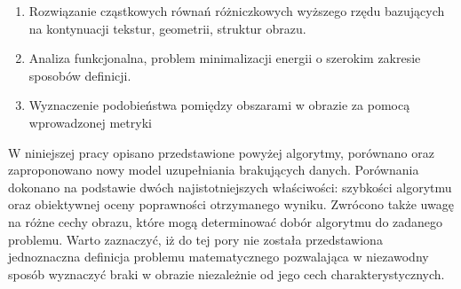 \documentclass[12pt, twoside, openany]{report}
\theoremstyle{definition}
\begin{document}
\begin{enumerate}
\item
Rozwiązanie cząstkowych równań różniczkowych wyższego rzędu bazujących na kontynuacji tekstur, geometrii, struktur obrazu.
\item
Analiza funkcjonalna, problem minimalizacji energii o szerokim zakresie sposobów definicji.
\item
Wyznaczenie podobieństwa pomiędzy obszarami w obrazie za pomocą wprowadzonej metryki 
\end{enumerate}
W niniejszej pracy opisano przedstawione powyżej algorytmy, porównano oraz zaproponowano nowy model uzupełniania brakujących danych. Porównania dokonano na podstawie dwóch najistotniejszych właściwości: szybkości algorytmu oraz obiektywnej oceny poprawności otrzymanego wyniku. Zwrócono także uwagę na różne cechy obrazu, które mogą determinować dobór algorytmu do zadanego problemu. Warto zaznaczyć, iż do tej pory nie została przedstawiona jednoznaczna definicja problemu matematycznego pozwalająca w niezawodny sposób wyznaczyć braki w obrazie niezależnie od jego cech charakterystycznych.
\end{document}
